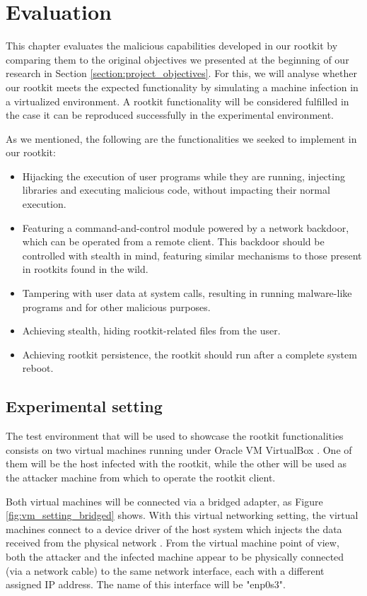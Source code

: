 \chapter{Evaluation} \label{chapter:evaluation}
This chapter evaluates the malicious capabilities developed in our rootkit by comparing them to the original objectives we presented at the beginning of our research in Section \ref{section:project_objectives}. For this, we will analyse whether our rootkit meets the expected functionality by simulating a machine infection in a virtualized environment. A rootkit functionality will be considered fulfilled in the case it can be reproduced successfully in the experimental environment.

As we mentioned, the following are the functionalities we seeked to implement in our rootkit:
\begin{itemize}
\item Hijacking the execution of user programs while they are running, injecting libraries and executing malicious code, without impacting their normal execution.
\item Featuring a command-and-control module powered by a network backdoor, which can be operated from a remote client. This backdoor should be controlled with stealth in mind, featuring similar mechanisms to those present in rootkits found in the wild.
\item Tampering with user data at system calls, resulting in running malware-like programs and for other malicious purposes.
\item Achieving stealth, hiding rootkit-related files from the user.
\item Achieving rootkit persistence, the rootkit should run after a complete system reboot.
\end{itemize}

\section{Experimental setting}
The test environment that will be used to showcase the rootkit functionalities consists on two virtual machines running under Oracle VM VirtualBox \cite{virtualbox_page}. One of them will be the host infected with the rootkit, while the other will be used as the attacker machine from which to operate the rootkit client.

Both virtual machines will be connected via a bridged adapter, as Figure \ref{fig:vm_setting_bridged} shows. With this virtual networking setting, the virtual machines connect to a device driver of the host system which injects the data received from the physical network \cite{bridged_networking}. From the virtual machine point of view, both the attacker and the infected machine appear to be physically connected (via a network cable) to the same network interface, each with a different assigned IP address. The name of this interface will be "enp0s3".

